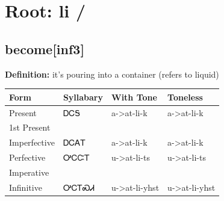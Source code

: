 \documentclass{article}%
\begin{document}
%
\normalsize%
\section*{Root: li / }%
\subsection*{become[inf3]}%
\textbf{Definition: }%
it’s pouring into a container (refers to liquid)%
\\[0.5em]%
\begin{tabular}{|l|l|l|l|}%
\hline%
\textbf{Form}&\textbf{Syllabary}&\textbf{With Tone}&\textbf{Toneless}\\%
\hline%
Present&ᎠᏟᎦ&a{-}>at{-}li{-}k&a{-}>at{-}li{-}k\\%
1st Present&&&\\%
Imperfective&ᎠᏟᎪᎢ&a{-}>at{-}li{-}k&a{-}>at{-}li{-}k\\%
Perfective&ᎤᏟᏨᎢ&u{-}>at{-}li{-}ts&u{-}>at{-}li{-}ts\\%
Imperative&&&\\%
Infinitive&ᎤᏟᎢᏍᏗ&u{-}>at{-}li{-}yhst&u{-}>at{-}li{-}yhst\\%
\hline%
\end{tabular}%
\\[1em]%
\end{document}
